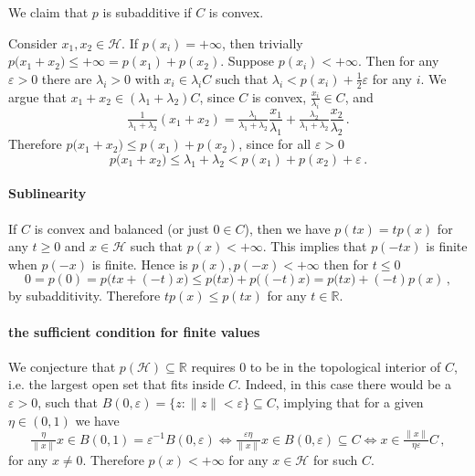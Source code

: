 \documentclass[a4paper]{article}
\newcommand{\Hcal}{\mathcal{H}}
\newcommand{\real}{\mathbb{R}}
\begin{document}
We claim that $p$ is subadditive if $C$ is convex.

Consider $x_1, x_2 \in \Hcal$. If $p(x_i) = +\infty$, then trivially $p\bigl( x_1
+ x_2 \bigr) \leq +\infty =  p(x_1) + p(x_2)$. Suppose $p(x_i) < + \infty$. Then
for any $\varepsilon > 0$ there are $\lambda_i > 0$ with $x_i \in \lambda_i C$ such
that $\lambda_i < p(x_i) + \tfrac12\varepsilon$ for any $i$. We argue that $x_1 + x_2
\in (\lambda_1 + \lambda_2) C$, since $C$ is convex, $\tfrac{x_i}{\lambda_i} \in C$,
and
\begin{equation*}
  \tfrac1{\lambda_1 + \lambda_2} (x_1 + x_2)
    = \tfrac{\lambda_1}{\lambda_1 + \lambda_2} \frac{x_1}{\lambda_1}
      + \tfrac{\lambda_2}{\lambda_1 + \lambda_2} \frac{x_2}{\lambda_2}
    \,.
\end{equation*}
Therefore $p\bigl( x_1 + x_2 \bigr) \leq p(x_1) + p(x_2)$, since for all $\varepsilon
> 0$
\begin{equation*}
  p\bigl( x_1 + x_2 \bigr)
    \leq \lambda_1 + \lambda_2
    < p(x_1) + p(x_2) + \varepsilon
    \,.
\end{equation*}


\paragraph{Sublinearity} %
\label{par:sublinearity}

If $C$ is convex and balanced (or just $0 \in C$), then we have $p(t x) = t p(x)$
for any $t\geq 0$ and $x\in \Hcal$ such that $p(x) < +\infty$. This implies that
$p(-t x)$ is finite when $p(-x)$ is finite. Hence is $p(x), p(-x) < +\infty$ then
for $t \leq 0$
\begin{equation*}
  0 = p(0)
    = p\bigl( t x + (- t) x \bigr)
    \leq p\bigl( t x \bigr) + p\bigl( (- t) x \bigr)
    = p\bigl( t x \bigr) + (- t) p( x )
    \,,
\end{equation*}
by subadditivity. Therefore $t p(x) \leq p(t x)$ for any $t\in \real$.


\paragraph{the sufficient condition for finite values} %
\label{par:the_sufficient_condition_for_finite_values}

We conjecture that $p(\Hcal) \subseteq \real$ requires $0$ to be in the topological
interior of $C$, i.e. the largest open set that fits inside $C$. Indeed, in this
case there would be a $\varepsilon > 0$, such that $B(0, \varepsilon) = \{z\colon
\|z\| < \varepsilon\} \subseteq C$, implying that for a given $\eta \in (0, 1)$ we
have
\begin{equation*}
  \tfrac{\eta}{\|x\|} x \in B(0, 1) = \varepsilon^{-1} B(0, \varepsilon)
  \Leftrightarrow
  \tfrac{\varepsilon \eta}{\|x\|} x \in B(0, \varepsilon)
  \subseteq C
  \Leftrightarrow
  x \in \tfrac{\|x\|}{\eta \varepsilon} C
  \,,
\end{equation*}
for any $x\neq 0$. Therefore $p(x) < +\infty$ for any $x\in \Hcal$ for such $C$.
\end{document}
